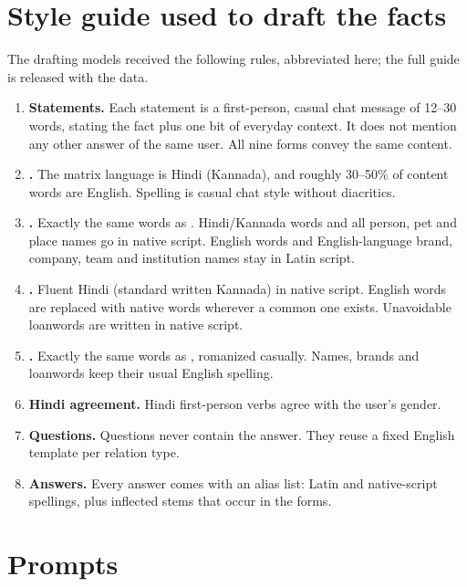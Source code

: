 \section{Style guide used to draft the facts}
\label{app:style}
The drafting models received the following rules, abbreviated here; the full guide is released with the data.
\begin{enumerate}
\item \textbf{Statements.} Each statement is a first-person, casual chat message of 12--30 words, stating the fact plus one bit of everyday context. It does not mention any other answer of the same user. All nine forms convey the same content.
\item \textbf{.} The matrix language is Hindi (Kannada), and roughly 30--50\% of content words are English. Spelling is casual chat style without diacritics.
\item \textbf{.} Exactly the same words as . Hindi/Kannada words and all person, pet and place names go in native script. English words and English-language brand, company, team and institution names stay in Latin script.
\item \textbf{.} Fluent Hindi (standard written Kannada) in native script. English words are replaced with native words wherever a common one exists. Unavoidable loanwords are written in native script.
\item \textbf{.} Exactly the same words as , romanized casually. Names, brands and loanwords keep their usual English spelling.
\item \textbf{Hindi agreement.} Hindi first-person verbs agree with the user's gender.
\item \textbf{Questions.} Questions never contain the answer. They reuse a fixed English template per relation type.
\item \textbf{Answers.} Every answer comes with an alias list: Latin and native-script spellings, plus inflected stems that occur in the forms.
\end{enumerate}

\section{Prompts}
\label{app:prompts}
